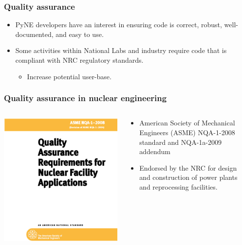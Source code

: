\documentclass[12pt]{beamer}
\begin{document}
\begin{frame}[fragile]
\frametitle{Quality assurance}

\begin{itemize}
\item{PyNE developers have an interest in ensuring code is correct, robust,
well-documented, and easy to use.}
\item{Some activities within National Labs and industry require code that is compliant with NRC regulatory standards.}
\begin{itemize}
\item{Increase potential user-base.}
\end{itemize}
\end{itemize}

\end{frame}
\begin{frame}[fragile]
\frametitle{Quality assurance in nuclear engineering}

\begin{columns}[T]
\begin{column}{0.5\textwidth}
\includegraphics[width=\textwidth]{figures/nqa-1-2008.png}
\end{column}
\begin{column}{0.5\textwidth}
\begin{itemize}
\item{American Society of Mechanical Engineers (ASME)
NQA-1-2008 \cite{nqa} standard and NQA-1a-2009 \cite{add} addendum}
\item{Endorsed by the NRC for design and construction of power plants and reprocessing facilities.}
\end{itemize}
\end{column}
\end{columns}


\end{frame}
\end{document}
